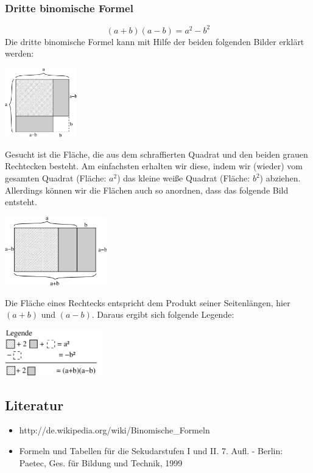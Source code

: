 \subsubsection{Dritte binomische Formel}
	\[(a + b)(a - b) = a^2 - b^2\]
Die dritte binomische Formel kann mit Hilfe der beiden folgenden Bilder erklärt werden:
\begin{center}
\includegraphics[height=3cm]{img/binF3a.pdf}
\end{center}
Gesucht ist die Fläche, die aus dem schraffierten Quadrat und den beiden grauen Rechtecken besteht. Am einfachsten erhalten wir diese, indem wir (wieder) vom gesamten Quadrat (Fläche: $a^2$) das kleine wei\ss e Quadrat (Fläche: $b^2$) abziehen. Allerdings können wir die Flächen auch so anordnen, dass das folgende Bild entsteht.
\begin{center}
\includegraphics[height=3cm]{img/binF3b.pdf}
\end{center}
Die Fläche eines Rechtecks entspricht dem Produkt seiner Seitenlängen, hier $(a+b)$ und $(a-b)$. Daraus ergibt sich folgende Legende:
\begin{center}
\includegraphics[height=2cm]{img/binF3legende.pdf}
\end{center}
\subsection{Literatur}
\begin{itemize}
	\item http://de.wikipedia.org/wiki/Binomische\_Formeln
	\item Formeln und Tabellen für die Sekudarstufen I und II. 7. Aufl. - Berlin: Paetec, Ges. für Bildung und Technik, 1999
\end{itemize}
